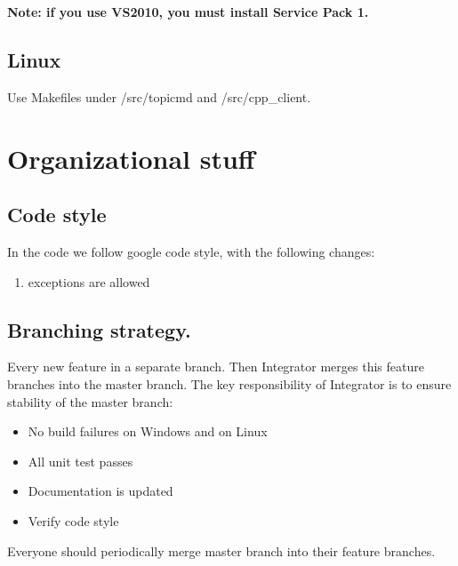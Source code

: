 \documentclass[11pt,a4paper,twoside]{report}
\begin{document}
{\bf Note: if you use VS2010, you must install Service Pack 1.}

\subsection{Linux}

Use Makefiles under /src/topicmd and /src/cpp\_client.

\section{Organizational stuff}

\subsection{Code style}
In the code we follow google code style, with the following changes:
\begin{enumerate}
    \item exceptions are allowed
\end{enumerate}

\subsection{Branching strategy.}
Every new feature in a separate branch.
Then Integrator merges this feature branches into the master branch.
The key responsibility of Integrator is to ensure stability of the master branch:
\begin{itemize}
    \item No build failures on Windows and on Linux
    \item All unit test passes
    \item Documentation is updated
    \item Verify code style
\end{itemize}
Everyone should periodically merge master branch into their feature branches.
\end{document}

